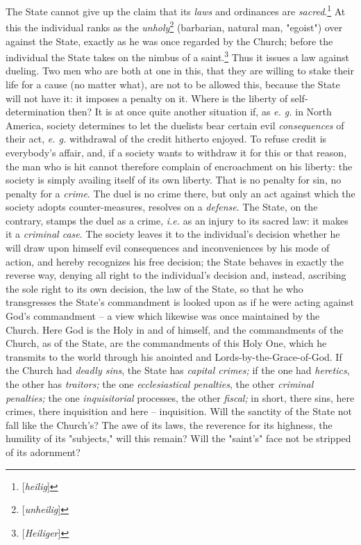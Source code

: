 \documentclass[a4paper]{book}
\begin{document}
The State cannot give up the claim that its \textit{laws} and ordinances are 
\textit{sacred}.\footnote{[\textit{heilig}]} At this the individual ranks as 
the \textit{unholy}\footnote{[\textit{unheilig}]} (barbarian, natural man, 
"{}egoist"{}) over against the State, exactly as he was once regarded by the 
Church; before the individual the State takes on the nimbus of a 
saint.\footnote{[\textit{Heiliger}]} Thus it issues a law against dueling. Two 
men who are both at one in this, that they are willing to stake their life for 
a cause (no matter what), are not to be allowed this, because the State will 
not have it: it imposes a penalty on it. Where is the liberty of 
self-determination then? It is at once quite another situation if, as 
\textit{e. g.} in North America, society determines to let the duelists bear 
certain evil \textit{consequences} of their act, \textit{e. g.} withdrawal of 
the credit hitherto enjoyed. To refuse credit is everybody's affair, and, if a 
society wants to withdraw it for this or that reason, the man who is hit 
cannot therefore complain of encroachment on his liberty: the society is 
simply availing itself of its own liberty. That is no penalty for sin, no 
penalty for a \textit{crime}. The duel is no crime there, but only an act 
against which the society adopts counter-measures, resolves on a 
\textit{defense}. The State, on the contrary, stamps the duel as a crime, 
\textit{i.e.} as an injury to its sacred law: it makes it a \textit{criminal 
case}. The society leaves it to the individual's decision whether he will draw 
upon himself evil consequences and inconveniences by his mode of action, and 
hereby recognizes his free decision; the State behaves in exactly the reverse 
way, denying all right to the individual's decision and, instead, ascribing 
the sole right to its own decision, the law of the State, so that he who 
transgresses the State's commandment is looked upon as if he were acting 
against God's commandment -- a view which likewise was once maintained by the 
Church. Here God is the Holy in and of himself, and the commandments of the 
Church, as of the State, are the commandments of this Holy One, which he 
transmits to the world through his anointed and Lords-by-the-Grace-of-God. If 
the Church had \textit{deadly sins}, the State has \textit{capital crimes;} if 
the one had \textit{heretics}, the other has \textit{traitors;} the one 
\textit{ecclesiastical penalties}, the other \textit{criminal penalties;} the 
one \textit{inquisitorial} processes, the other \textit{fiscal;} in short, 
there sins, here crimes, there inquisition and here -- inquisition. Will the 
sanctity of the State not fall like the Church's? The awe of its laws, the 
reverence for its highness, the humility of its "{}subjects,"{} will this 
remain? Will the "{}saint's"{} face not be stripped of its adornment?
\end{document}
